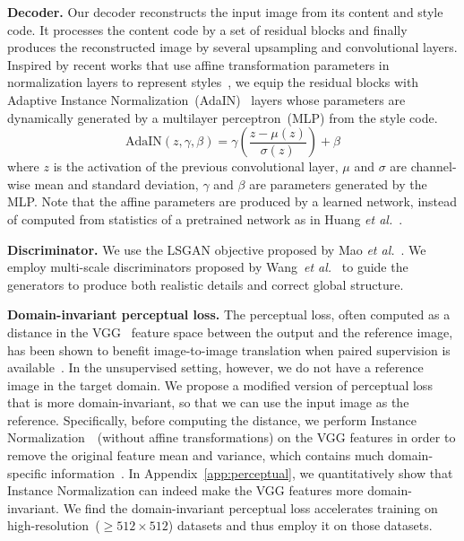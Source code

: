 \documentclass[runningheads]{llncs}
\newcommand{\vpara}[1]{\vspace{0.05in}\noindent\textbf{#1}}
\def\etal{\emph{et al.}\xspace}
\begin{document}
	\vpara{Decoder.} Our decoder reconstructs the input image from its content and style code. It processes the content code by a set of residual blocks and finally produces the reconstructed image by several upsampling and convolutional layers.
	Inspired by recent works that use affine transformation parameters in normalization layers to represent styles~\cite{huang2017adain,dumoulin2017learned,wang2017zm,ghiasi2017exploring}, we equip the residual blocks with Adaptive Instance Normalization~(AdaIN)~\cite{huang2017adain} layers whose parameters are dynamically generated by a multilayer perceptron~(MLP) from the style code.
\begin{equation}
	\textrm{AdaIN}(z, \gamma, \beta)= \gamma\left(\frac{z-\mu(z)}{\sigma(z)}\right)+\beta
\end{equation}
	where $z$ is the activation of the previous convolutional layer, $\mu$ and $\sigma$ are channel-wise mean and standard deviation, $\gamma$ and $\beta$ are parameters generated by the MLP. Note that the affine parameters are produced by a learned network, instead of computed from statistics of a pretrained network as in Huang \etal~\cite{huang2017adain}.


	\vpara{Discriminator.}  We use the LSGAN objective proposed by Mao \etal~\cite{mao2017least}.
	We employ multi-scale discriminators proposed by Wang~\etal~\cite{wang2018high} to guide the generators to produce both realistic details and correct global structure. 
	
	\vpara{Domain-invariant perceptual loss.} The perceptual loss, often computed as a distance in the VGG~\cite{simonyan2015very} feature space between the output and the reference image, has been shown to benefit image-to-image translation when paired supervision is available~\cite{chen2017photographic,wang2018high}. 
	In the unsupervised setting, however, we do not have a reference image in the target domain.
We propose a modified version of perceptual loss that is more domain-invariant, so that we can use the input image as the reference. Specifically, before computing the distance, we perform Instance Normalization~\cite{ulyanov2017improved}~(without affine transformations) on the VGG features in order to remove the original feature mean and variance, which contains much domain-specific information~\cite{huang2017adain,li2016revisiting}. In Appendix~\ref{app:perceptual}, we quantitatively show that Instance Normalization can indeed make the VGG features more domain-invariant. We find the domain-invariant perceptual loss accelerates training on high-resolution~($\geq512\times512$) datasets and thus employ it on those datasets.
\end{document}
